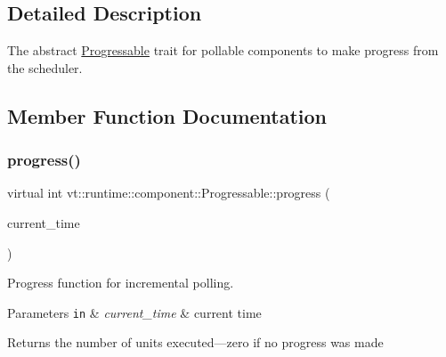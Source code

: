 \subsection{Detailed Description}
The abstract {\ttfamily \hyperlink{structvt_1_1runtime_1_1component_1_1_progressable}{Progressable}} trait for pollable components to make progress from the scheduler. 

\subsection{Member Function Documentation}
\mbox{\label{structvt_1_1runtime_1_1component_1_1_progressable_a75f1e623643f2273835fdf047d3d0cd3}} 
\subsubsection{\texorpdfstring{progress()}{progress()}}
{\footnotesize\ttfamily virtual int vt\+::runtime\+::component\+::\+Progressable\+::progress (\begin{DoxyParamCaption}\item[{\hyperlink{namespacevt_a876a9d0cd5a952859c72de8a46881442}{Time\+Type}}]{current\+\_\+time }\end{DoxyParamCaption})\hspace{0.3cm}{\ttfamily [pure virtual]}}



Progress function for incremental polling. 


\begin{DoxyParams}[1]{Parameters}
\mbox{\tt in}  & {\em current\+\_\+time} & current time\\
\hline
\end{DoxyParams}
\begin{DoxyReturn}{Returns}
the number of units executed---zero if no progress was made 
\end{DoxyReturn}


